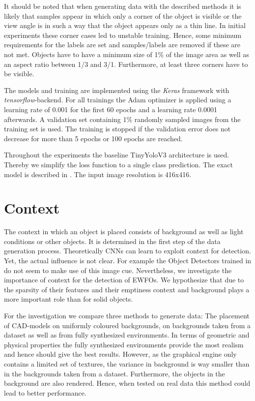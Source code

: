 It should be noted that when generating data with the described methods it is likely that samples appear in which only a corner of the object is visible or the view angle is in such a way that the object appears only as a thin line. In initial experiments these corner cases led to unstable training. Hence, some minimum requirements for the labels are set and samples/labels are removed if these are not met. Objects have to have a minimum size of 1\% of the image area as well as an aspect ratio between 1/3 and 3/1. Furthermore, at least three corners have to be visible.

The models and training are implemented using the \textit{Keras} framework with \textit{tensorflow}-backend. For all trainings the Adam optimizer is applied using a learning rate of 0.001 for the first 60 epochs and a learning rate 0.0001 afterwards. A validation set containing 1\% randomly sampled images from the training set is used. The training is stopped if the validation error does not decrease for more than 5 epochs or 100 epochs are reached.

Throughout the experiments the baseline TinyYoloV3 architecture is used. Thereby we simplify the loss function to a single class prediction. The exact model is described in . The input image resolution is 416x416.

\section{Context}

The context in which an object is placed consists of background as well as light conditions or other objects. It is determined in the first step of the data generation process. Theoretically \acp{CNN} can learn to exploit context for detection. Yet, the actual influence is not clear. For example the Object Detectors trained in \cite{Peng} do not seem to make use of this image cue. Nevertheless, we investigate the importance of context for the detection of \acp{EWFO}. We hypothesize that due to the sparsity of their features and their emptiness context and background plays a more important role than for solid objects.

For the investigation we compare three methods to generate data: The placement of \ac{CAD}-models on uniformly coloured backgrounds, on backgrounds taken from a dataset as well as from fully synthesized environments. In terms of geometric and physical properties the fully synthesized environments provide the most realism and hence should give the best results. However, as the graphical engine only contains a limited set of textures, the variance in background is way smaller than in the backgrounds taken from a dataset. Furthermore, the objects in the background are also rendered. Hence, when tested on real data this method could lead to better performance.

